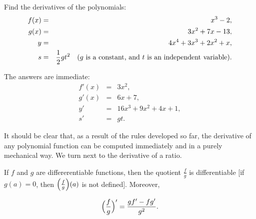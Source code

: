 \begin{example}
Find the derivatives of the polynomials:
\begin{eqnarray*}
f(x) &=& x^3- 2,                \\
g(x) &=& 3x^2 + 7x - 13,  \\
y &=& 4x^4 + 3x^3 + 2x^2 + x,\\
s &=& \frac{1}{2}gt^2
\quad \mbox{($g$ is a constant, and $t$ is an independent variable)} . 
\end{eqnarray*} 

The answers are immediate:
\begin{eqnarray*}
 f'(x) &=& 3x^2,                 \\
g'(x) &=& 6x + 7,               \\
    y' &=& 16x^3 + 9x^2 + 4x + 1, \\
    s' &=& gt.
\end{eqnarray*} 

It should be clear that, as a result of the rules developed so far,
the derivative of any polynomial function can be computed immediately
and in a purely mechanical way.
We turn next to the derivative of a ratio.
\end{example}

\begin{prop}\label{thm 1.7.6}
If $f$ and $g$ are differerentiable functions, then the quotient $\frac{f}{g}$ is differentiable [if $g(a) = 0$, then $\Bigl( \frac{f}{g} \Bigr) (a)$ is not defined]. Moreover, 

$$
\Bigl( \frac{f}{g} \Bigr)' = \frac{gf'- fg'}{g^2} .
$$
\end{prop}

